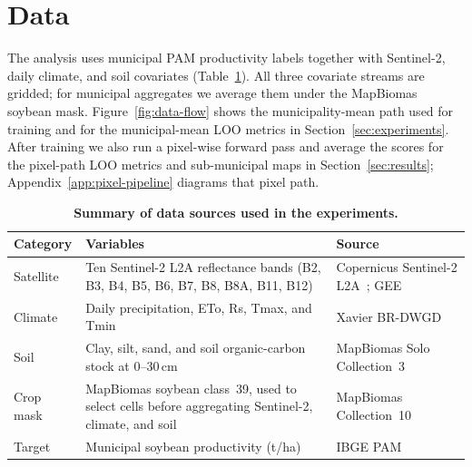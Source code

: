 \section{Data}
\label{sec:data}

The analysis uses municipal PAM productivity labels together with Sentinel-2, daily climate, and soil covariates (Table~\ref{tab:data-sources}).
All three covariate streams are gridded; for municipal aggregates we average them under the MapBiomas soybean mask.
Figure~\ref{fig:data-flow} shows the municipality-mean path used for training and for the municipal-mean LOO metrics in Section~\ref{sec:experiments}.
After training we also run a pixel-wise forward pass and average the scores for the pixel-path LOO metrics and sub-municipal maps in Section~\ref{sec:results}; Appendix~\ref{app:pixel-pipeline} diagrams that pixel path.

\begin{table}[!htbp]
\centering
\caption{\textbf{Summary of data sources used in the experiments.}}
\label{tab:data-sources}
\footnotesize
\setlength{\tabcolsep}{4pt}
\begin{tabular}{@{}lp{7.0cm}p{4.1cm}@{}}
\toprule
Category & Variables & Source \\
\midrule
Satellite & Ten Sentinel-2 L2A reflectance bands (B2, B3, B4, B5, B6, B7, B8, B8A, B11, B12) & Copernicus Sentinel-2 L2A~\citep{esa2021sentinel2}; GEE~\citep{gorelick2017gee} \\
\midrule
Climate & Daily precipitation, ETo, Rs, Tmax, and Tmin & Xavier BR-DWGD~\citep{xavier2022} \\
\midrule
Soil & Clay, silt, sand, and soil organic-carbon stock at 0--30\,cm & MapBiomas Solo Collection~3~\citep{mapbiomassoil2025,mapbiomassoc2025} \\
\midrule
Crop mask & MapBiomas soybean class~39, used to select cells before aggregating Sentinel-2, climate, and soil & MapBiomas Collection~10~\citep{mapbiomas2025} \\
\midrule
Target & Municipal soybean productivity (\si{t/ha}) & IBGE PAM~\citep{ibgepam} \\
\bottomrule
\end{tabular}
\end{table}

